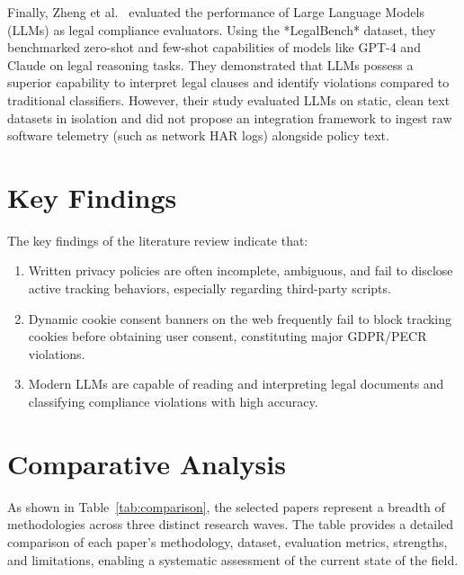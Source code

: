 \documentclass[11pt,a4paper]{article}
\begin{document}
Finally, Zheng et al.~\cite{zheng-2025-legalbench} evaluated the performance of Large Language Models (LLMs) as legal compliance evaluators. Using the *LegalBench* dataset, they benchmarked zero-shot and few-shot capabilities of models like GPT-4 and Claude on legal reasoning tasks. They demonstrated that LLMs possess a superior capability to interpret legal clauses and identify violations compared to traditional classifiers. However, their study evaluated LLMs on static, clean text datasets in isolation and did not propose an integration framework to ingest raw software telemetry (such as network HAR logs) alongside policy text.

\section{Key Findings}
The key findings of the literature review indicate that:
\begin{enumerate}
    \item Written privacy policies are often incomplete, ambiguous, and fail to disclose active tracking behaviors, especially regarding third-party scripts.
    \item Dynamic cookie consent banners on the web frequently fail to block tracking cookies before obtaining user consent, constituting major GDPR/PECR violations.
    \item Modern LLMs are capable of reading and interpreting legal documents and classifying compliance violations with high accuracy.
\end{enumerate}

\section{Comparative Analysis}
As shown in Table~\ref{tab:comparison}, the selected papers represent a breadth of methodologies across three distinct research waves. The table provides a detailed comparison of each paper's methodology, dataset, evaluation metrics, strengths, and limitations, enabling a systematic assessment of the current state of the field.
\end{document}
